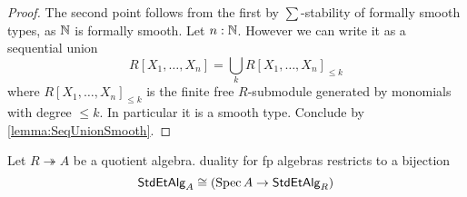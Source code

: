 \begin{proof}
	The second point follows from the first by $\sum$-stability of formally smooth types, as $\mathbb{N}$ is formally smooth. Let $n : \mathbb{N}$.%
	However we can write it as a sequential union
	\[
	R[X_1,\hdots,X_n] = \bigcup_k R[X_1,\hdots,X_n]_{\le k}
	\]
	where $ R[X_1,\hdots,X_n]_{\le k}$ is the finite free $R$-submodule generated by monomials with degree $\le k$. In particular it is a smooth type. Conclude by \ref{lemma:SeqUnionSmooth}.
\end{proof}
\begin{prop}{\label{prop:StdEtDualityForQuotients}}
	Let $R \twoheadrightarrow A$ be a quotient algebra. duality for fp algebras restricts to a bijection
	\[
	\mathsf{StdEtAlg}_A \cong (\operatorname{Spec} A \to \mathsf{StdEtAlg}_R)
	\]
\end{prop}

